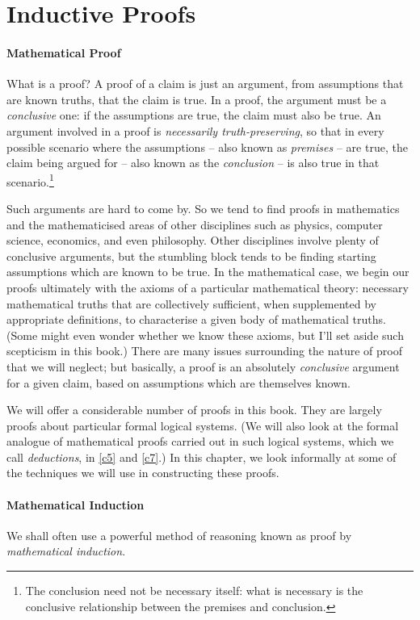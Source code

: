 
\section{Inductive Proofs}

\paragraph{Mathematical Proof} What is a proof? A proof of a claim is just an argument, from assumptions that are known truths, that the claim is true. In a proof, the argument must be a \emph{conclusive} one: if the assumptions are true, the claim must also be true. An argument involved in a proof is \emph{necessarily truth-preserving}, so that in every possible scenario where the assumptions – also known as \emph{premises} – are true, the claim being argued for – also known as the \emph{conclusion} – is also true in that scenario.\footnote{The conclusion need not be necessary itself: what is necessary is the conclusive relationship between the premises and conclusion.}

Such arguments are hard to come by. So we tend to find proofs in mathematics and the mathematicised areas of other disciplines such as physics, computer science, economics, and even philosophy. Other disciplines involve plenty of conclusive arguments, but the stumbling block tends to be finding starting assumptions which are known to be true. In the mathematical case, we begin our proofs  ultimately with the axioms of a particular mathematical theory: necessary mathematical truths that are collectively sufficient, when supplemented by appropriate definitions, to characterise a given body of mathematical truths. (Some might even wonder whether we know these axioms, but I'll set aside such scepticism in this book.) There are many issues surrounding the nature of proof that we will neglect; but basically, a proof is an absolutely \emph{conclusive} argument for a given claim, based on assumptions which are themselves known.

We will offer a considerable number of proofs in this book. They are largely proofs about particular formal logical systems. (We will also look at the formal analogue of mathematical proofs carried out in such logical systems, which we call \emph{deductions}, in \autoref{c5} and \autoref{c7}.) In this chapter, we look informally at some of the techniques we will use in constructing these proofs.

\paragraph{Mathematical Induction}
 We shall often use a powerful method of reasoning known as proof by \emph{mathematical induction}. 

